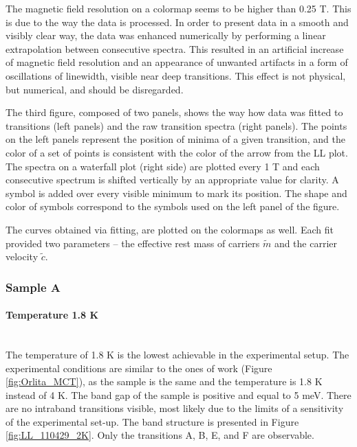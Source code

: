 \documentclass[titlepage,a4paper]{book}
\newcommand{\wciecie}{\quad\phantom{v}}
\newcommand{\myparagraph}[1]{\paragraph{#1}\mbox{}\\}
\begin{document}

The magnetic field resolution on a colormap seems to be higher than 0.25 T. This is due to the way the data is processed. In order to present data in a smooth and visibly clear way, the data was enhanced numerically by performing a linear extrapolation between consecutive spectra. This resulted in an artificial increase of magnetic field resolution and an appearance of unwanted artifacts in a form of oscillations of linewidth, visible near deep transitions. This effect is not physical, but numerical, and should be disregarded.  

The third figure, composed of two panels, shows the way how data was fitted to transitions (left panels) and the raw transition spectra (right panels). The points on the left panels represent the position of minima of a given transition, and the color of a set of points is consistent with the color of the arrow from the LL plot. The spectra on a waterfall plot (right side) are plotted every 1 T and each consecutive spectrum is shifted vertically by an appropriate value for clarity. A symbol is added over every visible minimum to mark its position. The shape and color of symbols correspond to the symbols used on the left panel of the figure. 

The curves obtained via fitting, are plotted on the colormaps as well. Each fit provided two parameters -- the effective rest mass of carriers $\tilde{m}$ and the carrier velocity $\tilde{c}$.

\subsubsection{Sample A}
\myparagraph{Temperature 1.8 K}
\wciecie
The temperature of 1.8 K is the lowest achievable in the experimental setup. The experimental conditions are similar to the ones of work \cite{Orlita_MCT} (Figure \ref{fig:Orlita_MCT}), as the sample is the same and the temperature is 1.8 K instead of 4 K. The band gap of the sample is positive and equal to 5 meV. There are no intraband transitions visible, most likely due to the limits of a sensitivity of the experimental set-up. The band structure is presented in Figure \ref{fig:LL_110429_2K}. Only the transitions A, B, E, and F are observable.
\end{document}
